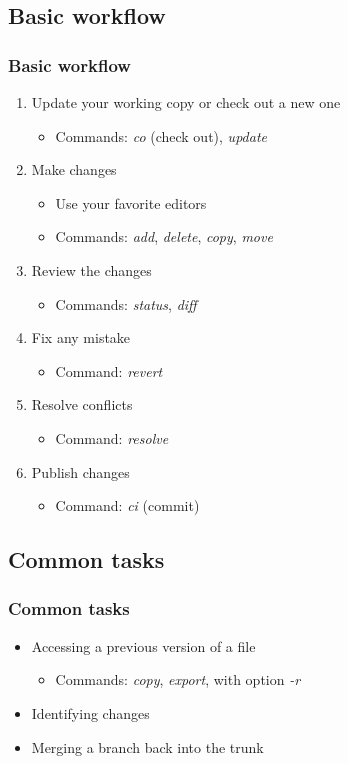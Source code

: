 \documentclass{beamer}
\begin{document}
\subsection{Basic workflow}

\frame
{
  \frametitle{Basic workflow}
  
  \begin{enumerate}
  \item<1-> Update your working copy or check out a new one
  	\begin{itemize}
  	\item<1-> Commands: \textit{co} (check out), \textit{update}
  	\end{itemize}
  \item<2-> Make changes
  	\begin{itemize}
	\item<2-> Use your favorite editors
	\item<2-> Commands: \textit{add}, \textit{delete}, \textit{copy}, \textit{move}
	\end{itemize}
  \item<3-> Review the changes
  	\begin{itemize}
	\item<3-> Commands: \textit{status}, \textit{diff}
	\end{itemize}
  \item<4-> Fix any mistake
  	\begin{itemize}
	\item<4-> Command: \textit{revert}
	\end{itemize}
  \item<5-> Resolve conflicts
  	\begin{itemize}
	\item<4-> Command: \textit{resolve}
	\end{itemize}
  \item<6-> Publish changes
  	\begin{itemize}
	\item<4-> Command: \textit{ci} (commit)
	\end{itemize}
  \end{enumerate}

}

\subsection{Common tasks}

\frame
{
  \frametitle{Common tasks}
  
  \begin{itemize}
  \item<1-> Accessing a previous version of a file
  	\begin{itemize}
	\item<1-> Commands: \textit{copy}, \textit{export}, with option \textit{-r}
	\end{itemize}
  \item<2-> Identifying changes
  \item<3-> Merging a branch back into the trunk
  \end{itemize}
  
}  
\end{document}
